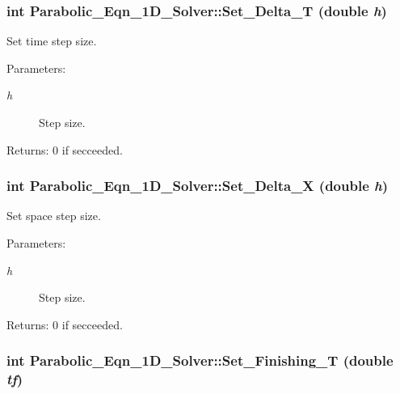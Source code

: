 \subsubsection{\setlength{\rightskip}{0pt plus 5cm}int Parabolic\_\-Eqn\_\-1D\_\-Solver::Set\_\-Delta\_\-T (double {\em h})}\label{classParabolic__Eqn__1D__Solver_ba640ca1a0eb84ca330a36a65cc2aeb4}


Set time step size. \begin{Desc}
\item[Parameters:]
\begin{description}
\item[{\em h}]Step size. \end{description}
\end{Desc}
\begin{Desc}
\item[Returns:]0 if secceeded. \end{Desc}
\subsubsection{\setlength{\rightskip}{0pt plus 5cm}int Parabolic\_\-Eqn\_\-1D\_\-Solver::Set\_\-Delta\_\-X (double {\em h})}\label{classParabolic__Eqn__1D__Solver_d8cfac7756e6eb71b5cf405e41c55684}


Set space step size. \begin{Desc}
\item[Parameters:]
\begin{description}
\item[{\em h}]Step size. \end{description}
\end{Desc}
\begin{Desc}
\item[Returns:]0 if secceeded. \end{Desc}
\subsubsection{\setlength{\rightskip}{0pt plus 5cm}int Parabolic\_\-Eqn\_\-1D\_\-Solver::Set\_\-Finishing\_\-T (double {\em tf})}\label{classParabolic__Eqn__1D__Solver_30420ca666a9f227664e26574e35cb06}


